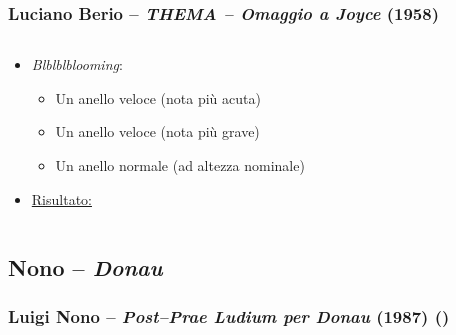 \documentclass[compress]{beamer}
\newcommand{\esdplay}[2]{\href{run: play -q \exampledir/#1}{#2 \pgfuseimage{speaker}}}
\begin{document}
\begin{frame}
    \frametitle{\normalsize Luciano Berio -- \emph{THEMA -- Omaggio a Joyce} (1958)} 

    \begin{columns}[T]
        \begin{column}{0.7\textwidth}
			    \begin{itemize}
			        \item \emph{Blblblblooming}:
			
			            \begin{itemize}
			                \item Un anello veloce (nota pi\`u acuta)
			                \item Un anello veloce (nota pi\`u grave)
			                \item Un anello normale (ad altezza nominale)
			            \end{itemize}
			
			        \item \esdplay{Blblblbooming.wav}{Risultato:}
			
			    \end{itemize}
        \end{column}
        \begin{column}{0.3\textwidth}
        \end{column}
    \end{columns}
        
\end{frame}

\subsection{Nono -- {\it Donau}}

\setcounter{ms}{0}
\begin{frame}
    \frametitle{\normalsize Luigi Nono -- \emph{Post--Prae Ludium per Donau} (1987) ()} 

    \begin{center}
       \\[0.5\baselineskip]
    \end{center}

\end{frame}
\end{document}
